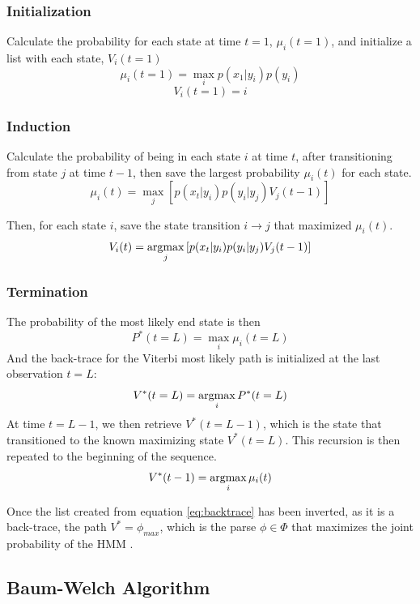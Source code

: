 \subsubsection{Initialization}
Calculate the probability for each state at time $t=1$, $\mu_i(t=1)$, and initialize a list with each state, $V_i(t=1)$
\begin{equation}
    \mu_i(t=1) = \max_i p(x_1|y_i)p(y_i)
\label{eq:fwdinit}
\end{equation}
$$    V_i(t=1) = i$$
\subsubsection{Induction}
Calculate the probability of being in each state $i$ at time $t$, after transitioning from state $j$ at time $t-1$, then save the largest probability $\mu_i(t)$ for each state. 
\begin{equation}
    \mu_i(t) =\max_j\left[p(x_t|y_i)p(y_i|y_j)V_j(t-1)\right]
\label{eq:fwdinduc}
\end{equation}

Then, for each state $i$, save the state transition $i\rightarrow j$ that maximized $\mu_i(t)$.  
$$V_i(t) =\operatorname*{argmax}_j\left[p(x_t|y_i)p(y_i|y_j)V_j(t-1)\right]$$

\subsubsection{Termination}
The probability of the most likely end state is then
\begin{equation}
    P^*(t=L) = \max_i{\mu_i(t=L)}
\label{eq:fwdterm}
\end{equation}
And the back-trace for the Viterbi most likely path is initialized at the last observation $t=L$:
$$V^*(t=L) = \operatorname*{argmax}_i{P^*(t=L)}$$
At time $t=L-1$, we then retrieve $V^*(t=L-1)$, which is the state that transitioned to the known maximizing state $V^*(t=L)$. This recursion is then repeated to the beginning of the sequence.
\begin{equation}
V^*(t-1) = \operatorname*{argmax}_i{\mu_i(t)}
\label{eq:backtrace}    
\end{equation}

Once the list created from equation \ref{eq:backtrace} has been inverted, as it is a back-trace, the path $V^* = \phi_{max}$, which is the parse $\phi \in \Phi$ that maximizes the joint probability of the HMM \cite{Rabiner1989ARecognition}. 
\subsection{Baum-Welch Algorithm}


\begin{singlespace}
\printbibliography
\end{singlespace}